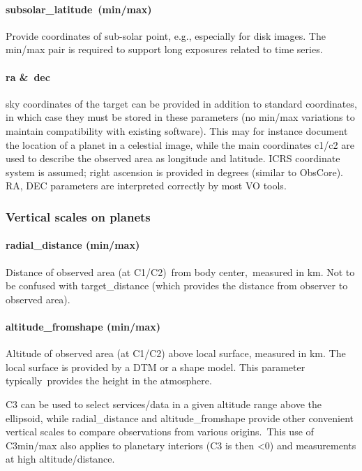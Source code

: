 \documentclass[11pt,a4paper]{ivoa}
\begin{document}
\paragraph{subsolar\_latitude (min/max)}

Provide coordinates of sub-solar point, e.g., especially for disk images. The min/max pair is required to support long exposures related to time series.

\paragraph{ra \& dec}

sky coordinates of the target can be provided in addition to standard coordinates, in which case they must be stored in these parameters (no min/max variations to maintain compatibility with existing software). This may for instance document the location of a planet in a celestial image, while the main coordinates c1/c2 are used to describe the observed area as longitude and latitude. ICRS coordinate system is assumed; right ascension is provided in degrees (similar to ObsCore). RA, DEC parameters are interpreted correctly by most VO tools.

\subsubsection{Vertical scales on planets}

\paragraph{radial\_distance (min/max)}

Distance of observed area (at C1/C2) from body center, measured in km. Not to be confused with target\_distance (which provides the distance from observer to observed area). 

\paragraph{altitude\_fromshape (min/max)}

Altitude of observed area (at C1/C2) above local surface, measured in km. The local surface is provided by a DTM or a shape model. This parameter typically provides the height in the atmosphere.

C3 can be used to select services/data in a given altitude range above the ellipsoid, while radial\_distance and altitude\_fromshape provide other convenient vertical scales to compare observations from various origins. This use of C3min/max also applies to planetary interiors (C3 is then <0) and measurements at high altitude/distance. 
\end{document}

